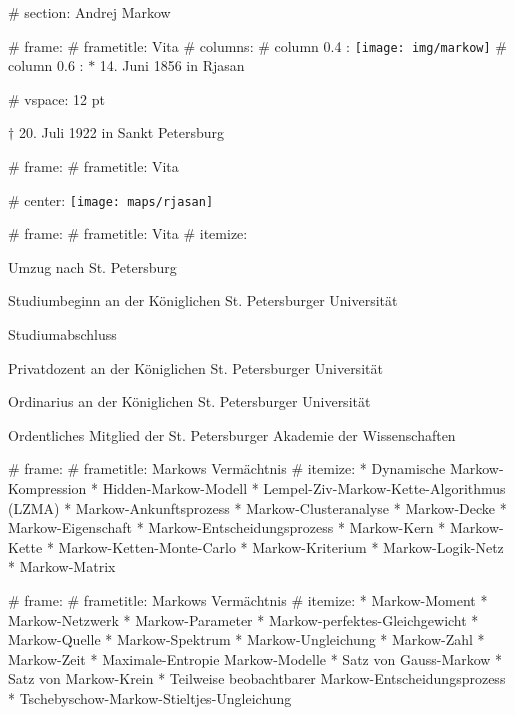 
# section: Andrej Markow

# frame:
  # frametitle: Vita
  # columns:
    # column {0.4 \textwidth}:
      \texttt{[image: img/markow]}
    # column {0.6 \textwidth}:
      $*$ 14. Juni 1856 in Rjasan

      # vspace: 12 pt

      $\dagger$ 20. Juli 1922 in Sankt Petersburg

# frame:
  # frametitle: Vita

  # center:
    \texttt{[image: maps/rjasan]}

# frame:
  # frametitle: Vita
    # itemize:
      \item[1866 (10)] Umzug nach St. Petersburg
      \item[1874 (18)] Studiumbeginn an der Königlichen St. Petersburger Universität
      \item[1878 (22)] Studiumabschluss
      \item[1880 (24)] Privatdozent an der Königlichen St. Petersburger Universität
      \item[1886 (30)] Ordinarius an der Königlichen St. Petersburger Universität
      \item[1896 (40)] Ordentliches Mitglied der St. Petersburger Akademie der Wissenschaften


# frame:
  # frametitle: Markows Vermächtnis
  # itemize:
    * Dynamische Markow-Kompression
    * Hidden-Markow-Modell
    * Lempel-Ziv-Markow-Kette-Algorithmus (LZMA)
    * Markow-Ankunftsprozess
    * Markow-Clusteranalyse
    * Markow-Decke
    * Markow-Eigenschaft
    * Markow-Entscheidungsprozess
    * Markow-Kern
    * Markow-Kette
    * Markow-Ketten-Monte-Carlo
    * Markow-Kriterium
    * Markow-Logik-Netz
    * Markow-Matrix

# frame:
  # frametitle: Markows Vermächtnis
  # itemize:
    * Markow-Moment
    * Markow-Netzwerk
    * Markow-Parameter
    * Markow-perfektes-Gleichgewicht
    * Markow-Quelle
    * Markow-Spektrum
    * Markow-Ungleichung
    * Markow-Zahl
    * Markow-Zeit
    * Maximale-Entropie Markow-Modelle
    * Satz von Gauss-Markow
    * Satz von Markow-Krein
    * Teilweise beobachtbarer Markow-Entscheidungsprozess
    * Tschebyschow-Markow-Stieltjes-Ungleichung


